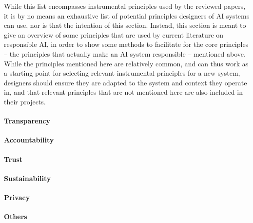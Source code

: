 While this list encompasses instrumental principles used by the reviewed papers, it
is by no means an exhaustive list of potential principles designers of AI systems can use, nor is that the intention of this section. Instead, this section is meant to give an overview of some principles that are used by current literature on responsible AI, in order to show some methods to facilitate for the core principles -- the principles that actually make an AI system responsible -- mentioned above. While the principles mentioned here are relatively common, and can thus work as a starting point for selecting relevant instrumental principles for a new system, designers should ensure they are adapted to the system and context they operate in, and that relevant principles that are not mentioned here are also included in their projects.

\paragraph{Transparency}

\paragraph{Accountability}

\paragraph{Trust}

\paragraph{Sustainability}

\paragraph{Privacy}

\paragraph{Others}



